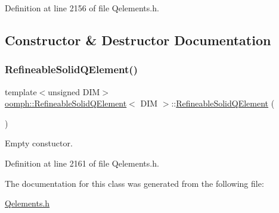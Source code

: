 Definition at line 2156 of file Qelements.\+h.



\subsection{Constructor \& Destructor Documentation}
\mbox{\label{classoomph_1_1RefineableSolidQElement_acd42603a0c4015653f722c54d52223ab}} 
\subsubsection{\texorpdfstring{Refineable\+Solid\+Q\+Element()}{RefineableSolidQElement()}}
{\footnotesize\ttfamily template$<$unsigned D\+IM$>$ \\
\hyperlink{classoomph_1_1RefineableSolidQElement}{oomph\+::\+Refineable\+Solid\+Q\+Element}$<$ D\+IM $>$\+::\hyperlink{classoomph_1_1RefineableSolidQElement}{Refineable\+Solid\+Q\+Element} (\begin{DoxyParamCaption}{ }\end{DoxyParamCaption})\hspace{0.3cm}{\ttfamily [inline]}}



Empty constuctor. 



Definition at line 2161 of file Qelements.\+h.



The documentation for this class was generated from the following file\+:\begin{DoxyCompactItemize}
\item 
\hyperlink{Qelements_8h}{Qelements.\+h}\end{DoxyCompactItemize}
